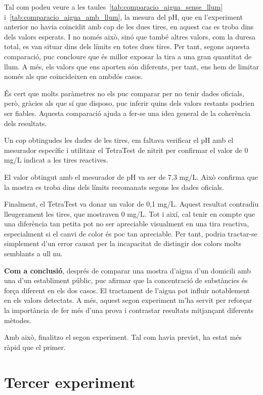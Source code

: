 Tal com podeu veure a les taules~\ref{tab:comparacio_aigua_sense_llum} i~\ref{tab:comparacio_aigua_amb_llum}, la mesura del pH, que en l’experiment anterior no havia coincidit amb cap de les dues tires, en aquest cas es troba dins dels valors esperats. I no només això, sinó que també altres valors, com la duresa total, es van situar dins dels límits en totes dues tires. Per tant, segons aquesta comparació, puc concloure que és millor exposar la tira a una gran quantitat de llum. A més, els valors que ens aporten són diferents, per tant, ens hem de limitar només als que coincideixen en ambdós casos.

És cert que molts paràmetres no els puc comparar per no tenir dades oficials, però, gràcies als que sí que disposo, puc inferir quins dels valors restants podrien ser fiables. Aquesta comparació ajuda a fer-se una idea general de la coherència dels resultats.

Un cop obtingudes les dades de les tires, em faltava verificar el pH amb el mesurador específic i utilitzar el TetraTest de nitrit per confirmar el valor de 0 mg/L indicat a les tires reactives.

El valor obtingut amb el mesurador de pH va ser de 7,3 mg/L. Això confirma que la mostra es troba dins dels límits recomanats segons les dades oficials.

Finalment, el TetraTest va donar un valor de 0,1 mg/L. Aquest resultat contradiu lleugerament les tires, que mostraven 0 mg/L. Tot i així, cal tenir en compte que una diferència tan petita pot no ser apreciable visualment en una tira reactiva, especialment si el canvi de color és poc tan apreciable. Per tant, podria tractar-se simplement d’un error causat per la incapacitat de distingir dos colors molts semblants a ull nu.

\textbf{Com a conclusió}, després de comparar una mostra d’aigua d’un domicili amb una d’un establiment públic, puc afirmar que la concentració de substàncies és força diferent en els dos casos. El tractament de l’aigua pot influir notablement en els valors detectats. A més, aquest segon experiment m’ha servit per reforçar la importància de fer més d’una prova i contrastar resultats mitjançant diferents mètodes.

Amb això, finalitzo el segon experiment. Tal com havia previst, ha estat més ràpid que el primer.%

\section{Tercer experiment}

